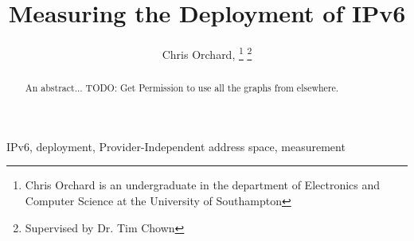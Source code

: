 \documentclass[final, conference, a4paper]{IEEEtran}
\begin{document}
\title{Measuring the Deployment of IPv6}

\author{Chris Orchard,
\thanks{Chris Orchard is an undergraduate in the department of Electronics and
Computer Science at the University of Southampton} 
\thanks{Supervised by Dr. Tim Chown}
}


\maketitle

\begin{abstract}
An abstract... TODO: Get Permission to use all the graphs from elsewhere.
\end{abstract}

\begin{IEEEkeywords}
IPv6, deployment, Provider-Independent address space, measurement
\end{IEEEkeywords}









{}
\end{document}
